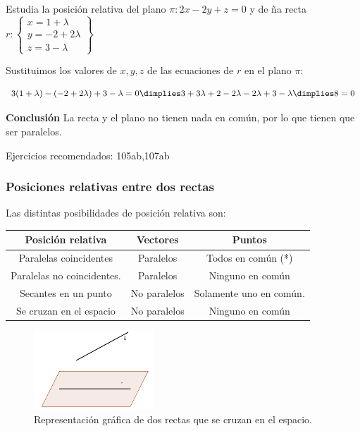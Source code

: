 \begin{problem}
Estudia la posición relativa del plano $\pi: 2x-2y+z=0$ y de ña recta $r:\left\{\begin{array}{c}
     x=1+\lambda\\
     y=-2+2\lambda\\
     z=3-\lambda 
\end{array}\right\}$
\solution

Sustituimos los valores de $x,y,z$ de las ecuaciones de $r$ en el plano $\pi$:

\[3(1+\lambda) - (-2+2\lambda) + 3 - \lambda = 0 \dimplies 3+3\lambda+2-2\lambda-2\lambda+3-\lambda \dimplies 8=0\]

\textbf{Conclusión} La recta y el plano no tienen nada en común, por lo que tienen que ser paralelos.

\end{problem}


Ejercicios recomendados: 105ab,107ab

\subsubsection{Posiciones relativas entre dos rectas}

Las distintas posibilidades de posición relativa son:

  \begin{tabular}{c|c|c}
\textbf{Posición relativa} & \textbf{Vectores} &\textbf{ Puntos}\\\hline
Paralelas coincidentes & Paralelos & Todos en común (*)\\
Paralelas no coincidentes. & Paralelos & Ninguno en común\\
Secantes en un punto & No paralelos & Solamente uno en común.\\
Se cruzan en el espacio & No paralelos & Ninguno en común\\
\end{tabular}

\begin{figure}[hptb]
    \centering
    \includegraphics[width=0.4\textwidth]{img/rectasquesecruzan.png}
    \caption{Representación gráfica de dos rectas que se cruzan en el espacio.}
    \label{fig::rectas_que_se_cruzan_en_el_espacio}
\end{figure}


